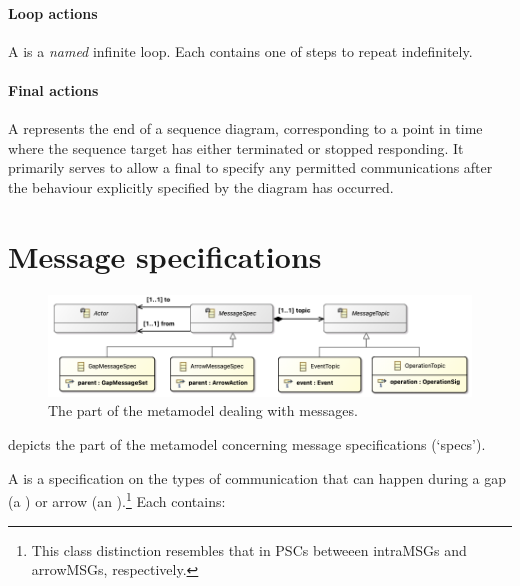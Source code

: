 \paragraph{Loop actions}

A \mloopaction{} is a \emph{named} infinite loop.    Each \mloopaction{} contains one
\msubsequence{} of steps to repeat indefinitely.

\paragraph{Final actions}

A \mfinalaction{} represents the end of a sequence diagram, corresponding
to a point in time where the sequence target has either terminated or stopped
responding.  It primarily serves to allow a final \msequencegap{} to specify
any permitted communications after the behaviour explicitly specified by the
diagram has occurred.


\section{Message specifications}\label{sec:metamodel-messages}

\begin{figure}
	\centering
	\includegraphics[width=.8\textwidth]{diagrams/messages.png}
	\caption{The part of the \langname{} metamodel dealing with messages.}
	\label{fig:metamodel-messages}
\end{figure}

 depicts the part of the metamodel concerning
message specifications (`specs').

A \mmessagespec{} is a specification on the types of communication that can
happen during a gap (a \mgapmessagespec) or arrow (an \marrowmessagespec).\footnote{
This class distinction resembles that in PSCs betweeen intraMSGs and arrowMSGs,
respectively.}  Each \mmessagespec{} contains:

